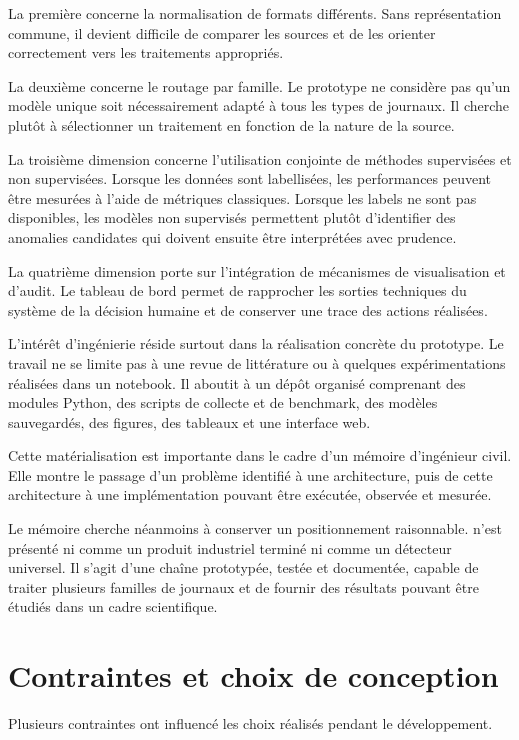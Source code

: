 La première concerne la normalisation de formats différents. Sans représentation commune, il devient difficile de comparer les sources et de les orienter correctement vers les traitements appropriés.

La deuxième concerne le routage par famille. Le prototype ne considère pas qu'un modèle unique soit nécessairement adapté à tous les types de journaux. Il cherche plutôt à sélectionner un traitement en fonction de la nature de la source.

La troisième dimension concerne l'utilisation conjointe de méthodes supervisées et non supervisées. Lorsque les données sont labellisées, les performances peuvent être mesurées à l'aide de métriques classiques. Lorsque les labels ne sont pas disponibles, les modèles non supervisés permettent plutôt d'identifier des anomalies candidates qui doivent ensuite être interprétées avec prudence.

La quatrième dimension porte sur l'intégration de mécanismes de visualisation et d'audit. Le tableau de bord permet de rapprocher les sorties techniques du système de la décision humaine et de conserver une trace des actions réalisées.

L'intérêt d'ingénierie réside surtout dans la réalisation concrète du prototype. Le travail ne se limite pas à une revue de littérature ou à quelques expérimentations réalisées dans un notebook. Il aboutit à un dépôt organisé comprenant des modules Python, des scripts de collecte et de benchmark, des modèles sauvegardés, des figures, des tableaux et une interface web.

Cette matérialisation est importante dans le cadre d'un mémoire d'ingénieur civil. Elle montre le passage d'un problème identifié à une architecture, puis de cette architecture à une implémentation pouvant être exécutée, observée et mesurée.

Le mémoire cherche néanmoins à conserver un positionnement raisonnable. \logminer{} n'est présenté ni comme un produit industriel terminé ni comme un détecteur universel. Il s'agit d'une chaîne prototypée, testée et documentée, capable de traiter plusieurs familles de journaux et de fournir des résultats pouvant être étudiés dans un cadre scientifique.

\section{Contraintes et choix de conception}

Plusieurs contraintes ont influencé les choix réalisés pendant le développement.

